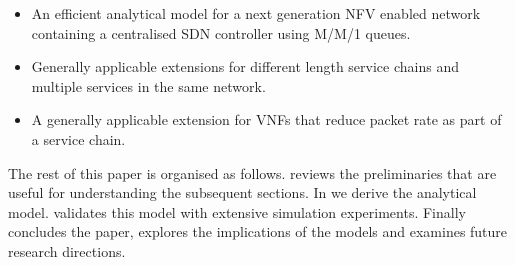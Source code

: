 \begin{itemize}
\item An efficient analytical model for a next generation NFV enabled network containing a centralised SDN controller using M/M/1 queues.
\item Generally applicable extensions for different length service chains and multiple services in the same network.
\item A generally applicable extension for VNFs that reduce packet rate as part of a service chain.
\end{itemize}

The rest of this paper is organised as follows.  reviews the preliminaries that are useful for understanding the subsequent sections. In  we derive the analytical model.  validates this model with extensive simulation experiments. Finally  concludes the paper, explores the implications of the models and examines future research directions.